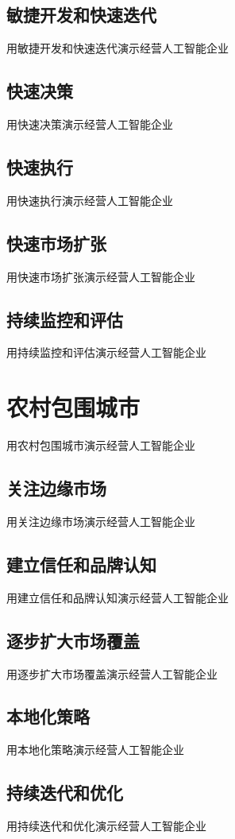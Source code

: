 \documentclass[12pt]{book}
\begin{document}
\subsection{敏捷开发和快速迭代}
用敏捷开发和快速迭代演示经营人工智能企业
\subsection{快速决策}
用快速决策演示经营人工智能企业
\subsection{快速执行}
用快速执行演示经营人工智能企业
\subsection{快速市场扩张}
用快速市场扩张演示经营人工智能企业
\subsection{持续监控和评估}
用持续监控和评估演示经营人工智能企业


\section{农村包围城市}
用农村包围城市演示经营人工智能企业

\subsection{关注边缘市场}
用关注边缘市场演示经营人工智能企业

\subsection{建立信任和品牌认知}
用建立信任和品牌认知演示经营人工智能企业

\subsection{逐步扩大市场覆盖}
用逐步扩大市场覆盖演示经营人工智能企业

\subsection{本地化策略}
用本地化策略演示经营人工智能企业

\subsection{持续迭代和优化}
用持续迭代和优化演示经营人工智能企业
\end{document}
